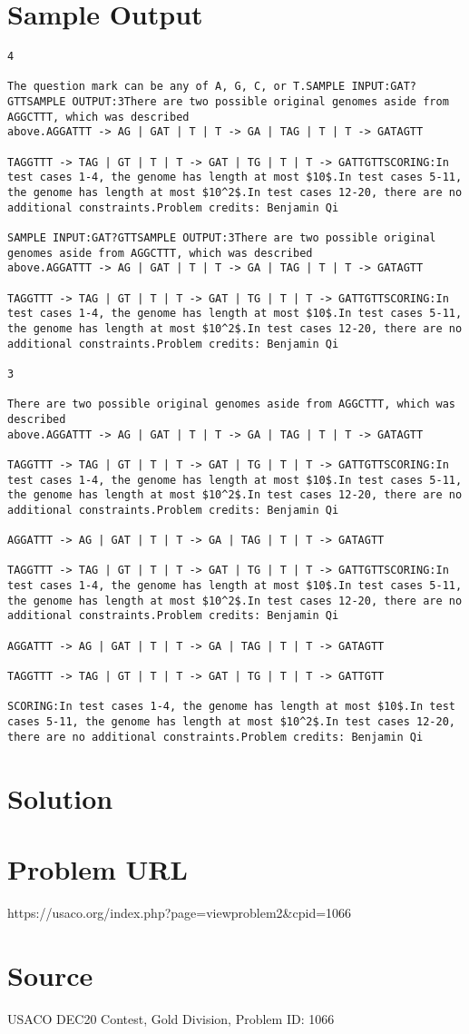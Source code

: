 \documentclass[12pt]{article}
\begin{document}
\section*{Sample Output}
\begin{verbatim}
4

The question mark can be any of A, G, C, or T.SAMPLE INPUT:GAT?GTTSAMPLE OUTPUT:3There are two possible original genomes aside from AGGCTTT, which was described
above.AGGATTT -> AG | GAT | T | T -> GA | TAG | T | T -> GATAGTT

TAGGTTT -> TAG | GT | T | T -> GAT | TG | T | T -> GATTGTTSCORING:In test cases 1-4, the genome has length at most $10$.In test cases 5-11, the genome has length at most $10^2$.In test cases 12-20, there are no additional constraints.Problem credits: Benjamin Qi

SAMPLE INPUT:GAT?GTTSAMPLE OUTPUT:3There are two possible original genomes aside from AGGCTTT, which was described
above.AGGATTT -> AG | GAT | T | T -> GA | TAG | T | T -> GATAGTT

TAGGTTT -> TAG | GT | T | T -> GAT | TG | T | T -> GATTGTTSCORING:In test cases 1-4, the genome has length at most $10$.In test cases 5-11, the genome has length at most $10^2$.In test cases 12-20, there are no additional constraints.Problem credits: Benjamin Qi

3

There are two possible original genomes aside from AGGCTTT, which was described
above.AGGATTT -> AG | GAT | T | T -> GA | TAG | T | T -> GATAGTT

TAGGTTT -> TAG | GT | T | T -> GAT | TG | T | T -> GATTGTTSCORING:In test cases 1-4, the genome has length at most $10$.In test cases 5-11, the genome has length at most $10^2$.In test cases 12-20, there are no additional constraints.Problem credits: Benjamin Qi

AGGATTT -> AG | GAT | T | T -> GA | TAG | T | T -> GATAGTT

TAGGTTT -> TAG | GT | T | T -> GAT | TG | T | T -> GATTGTTSCORING:In test cases 1-4, the genome has length at most $10$.In test cases 5-11, the genome has length at most $10^2$.In test cases 12-20, there are no additional constraints.Problem credits: Benjamin Qi

AGGATTT -> AG | GAT | T | T -> GA | TAG | T | T -> GATAGTT

TAGGTTT -> TAG | GT | T | T -> GAT | TG | T | T -> GATTGTT

SCORING:In test cases 1-4, the genome has length at most $10$.In test cases 5-11, the genome has length at most $10^2$.In test cases 12-20, there are no additional constraints.Problem credits: Benjamin Qi
\end{verbatim}

\section*{Solution}


\section*{Problem URL}
https://usaco.org/index.php?page=viewproblem2&cpid=1066

\section*{Source}
USACO DEC20 Contest, Gold Division, Problem ID: 1066
\end{document}
